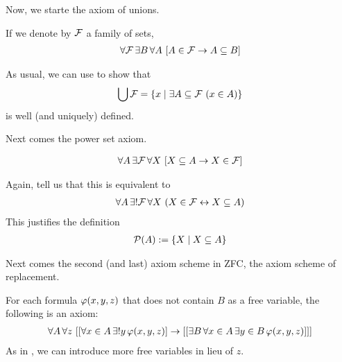 Now, we starte the axiom of unions.

\begin{baxiom}
    If we denote by $\mathcal{F}$ a family of sets,
    \begin{align*}
        \forall \mathcal{F} \, \exists B \, \forall A \, \left[ A \in \mathcal{F} \to A \subseteq B \right]
    \end{align*}
\end{baxiom}

As usual, we can use  to show that
\begin{align*}
    \bigcup \mathcal{F} = \left\{ x \; \middle\vert \; \exists A \subseteq \mathcal{F} \, \left( x \in A \right) \right\}
\end{align*}
is well (and uniquely) defined.

Next comes the power set axiom.

\begin{baxiom}
    \begin{align*}
        \forall A \, \exists \mathcal{F} \, \forall X \, \left[ X \subseteq A \to X \in \mathcal{F} \right]
    \end{align*}
\end{baxiom}

Again,  tell us that this is equivalent to
\begin{align*}
    \forall A \, \exists! \mathcal{F} \, \forall X \, \left( X \in \mathcal{F} \leftrightarrow X \subseteq A \right)
\end{align*}
This justifies the definition
\begin{align*}
    \mathcal{P}(A) := \left\{ X \; \middle\vert \; X \subseteq A \right\}
\end{align*}

Next comes the second (and last) axiom scheme in ZFC, the axiom scheme of replacement.

\begin{baxiom}\label{ZFC:Replacement}
    For each formula $\varphi\!\left( x, y, z \right)$ that does not contain $B$ as a free variable, the following is an axiom:
    \begin{align*}
        \forall A \, \forall z \, \left[ 
            \left[ \forall x \in A \, \exists! y \, \varphi\!\left( x, y, z \right) \right]
            \to
            \left[ \left[ \exists B \, \forall x \in A \, \exists y \in B \, \varphi\!\left( x, y, z \right) \right] \right]
         \right]
    \end{align*}
    As in , we can introduce more free variables in lieu of $z$.
\end{baxiom}

